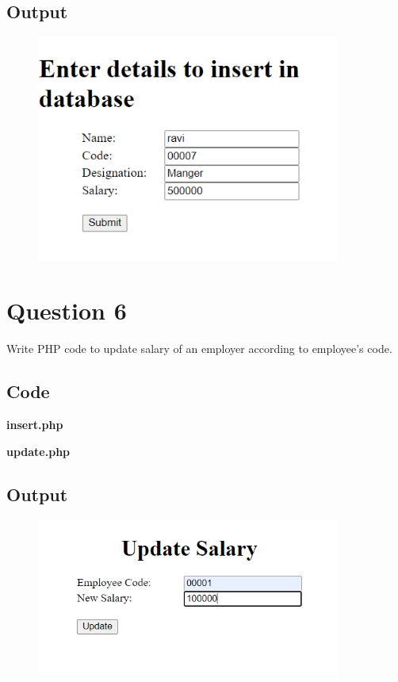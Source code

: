 \documentclass{article}
\begin{document}
\subsection*{Output}
\begin{figure}[H]
  \centering
  \includegraphics[width=10cm]{5/out.png}
\end{figure}

\newpage
\section*{Question 6}
Write PHP code to update salary of an employer according to employee's code.
\subsection*{Code}
\textbf{insert.php}

\textbf{update.php}

\newpage
\subsection*{Output}
\begin{figure}[H]
  \centeringz
  \includegraphics[width=10cm]{6/out.png}
\end{figure}

\newpage
\end{document}
